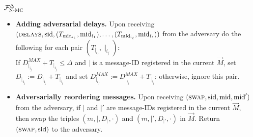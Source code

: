 \begin{systembox}{$\mathcal{F}_{\textsc{N-MC}}^{\Delta}$}
{\begin{itemize}
			\smallskip
			\item \textbf{Adding adversarial delays.}
			Upon receiving $(\textsc{delays},\text{sid}, (T_{\text{mid}_{i_1}},\text{mid}_{i_1}), \ldots, (T_{\text{mid}_{i_\ell}},\text{mid}_{i_\ell}))$ from the adversary do the following for each pair $(T_{\mid_{i_j}},\mid_{i_j})$: \\
			If $D_{\mid_{i_j}}^{MAX}+T_{\mid_{i_j}}\leq\Delta$ and $\mid$ is a message-ID registered in the current $\vec{M}$, set $D_{\mid_{i_j}}:= D_{\mid_{i_j}} + T_{\mid_{i_j}}$ and set $D_{\mid_{i_j}}^{MAX}:= D_{\mid_{i_j}}^{MAX} + T_{\mid_{i_j}}$; otherwise, ignore this pair.   
			
			\smallskip
			\item \textbf{Adversarially reordering messages.}
			Upon receiving $(\textsc{swap},\text{sid}, \text{mid}, \text{mid}')$ from the adversary, if $\mid$ and $\mid'$ are message-IDs registered in the current $\vec{M}$, then swap the triples $(m,\mid,D_\mid,\cdot)$ and $(m,\mid', D_{\mid'},\cdot)$ in $\vec{M}$. Return $(\textsc{swap},\text{sid})$ to the adversary. 
		\end{itemize}
	}
\end{systembox}

